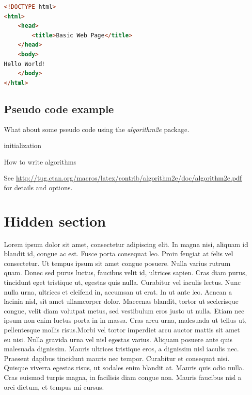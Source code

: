 \begin{lstlisting}[language=HTML,caption={Hello World in HTML},label={lst:helloworld},float=ht]
<!DOCTYPE html>
<html>
    <head>
        <title>Basic Web Page</title>
    </head>
    <body>
Hello World!
    </body>
</html>
\end{lstlisting}

\subsection{Pseudo code example}

What about some pseudo code using the \emph{algorithm2e} package.

\begin{algorithm}[H]
 \SetAlgoLined
 initialization\;
\caption{How to write algorithms}
\end{algorithm}

See \url{http://tug.ctan.org/macros/latex/contrib/algorithm2e/doc/algorithm2e.pdf} for details and options.

\tochide\section{Hidden section}

Lorem ipsum dolor sit amet, consectetur adipiscing elit. In magna nisi, aliquam id blandit id, congue ac est. Fusce porta consequat leo. Proin feugiat at felis vel consectetur. Ut tempus ipsum sit amet congue posuere. Nulla varius rutrum quam. Donec sed purus luctus, faucibus velit id, ultrices sapien. Cras diam purus, tincidunt eget tristique ut, egestas quis nulla. Curabitur vel iaculis lectus. Nunc nulla urna, ultrices et eleifend in, accumsan ut erat. In ut ante leo. Aenean a lacinia nisl, sit amet ullamcorper dolor. Maecenas blandit, tortor ut scelerisque congue, velit diam volutpat metus, sed vestibulum eros justo ut nulla. Etiam nec ipsum non enim luctus porta in in massa. Cras arcu urna, malesuada ut tellus ut, pellentesque mollis risus.Morbi vel tortor imperdiet arcu auctor mattis sit amet eu nisi. Nulla gravida urna vel nisl egestas varius. Aliquam posuere ante quis malesuada dignissim. Mauris ultrices tristique eros, a dignissim nisl iaculis nec. Praesent dapibus tincidunt mauris nec tempor. Curabitur et consequat nisi. Quisque viverra egestas risus, ut sodales enim blandit at. Mauris quis odio nulla. Cras euismod turpis magna, in facilisis diam congue non. Mauris faucibus nisl a orci dictum, et tempus mi cursus.


